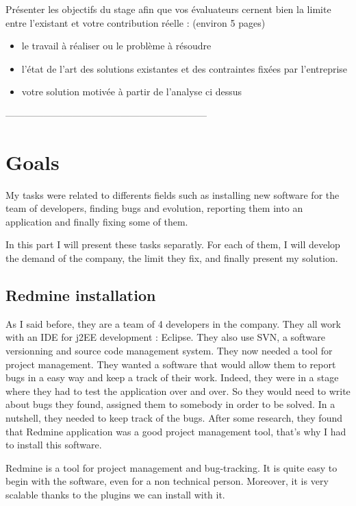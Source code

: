 

\newpage
Présenter les objectifs du stage afin que vos évaluateurs cernent bien la limite entre l’existant et votre contribution réelle : (environ 5 pages)
\begin{itemize}
	\item le travail à réaliser ou le problème à résoudre
	\item l’état de l’art des solutions existantes et des contraintes fixées par l’entreprise
	\item votre solution motivée à partir de l’analyse ci dessus
\end{itemize}


---------------------------------------------------------------

\newpage
\section{Goals}
My tasks were related to differents fields such as installing new software for the team 
of developers, finding bugs and evolution, reporting them into an application 
and finally fixing some of them. 

In this part I will present these tasks separatly. For each of them, I will develop 
the demand of the company, the limit they fix, and finally present my solution. 

\subsection{Redmine installation}
As I said before, they are a team of 4 developers in the company. 
They all work with an IDE for j2EE development : Eclipse. 
They also use SVN, a software versionning and source code management 
system. They now needed a tool for project management. 
They wanted a software that would allow them to report bugs in a easy way and keep a 
track of their work. Indeed, they were in a stage where they had to test the application
over and over. So they would need to write about bugs they found, assigned them to
somebody in order to be solved. In a nutshell, they needed to keep track of the bugs. 
After some research, they found that Redmine application was a good project management
tool, that's why I had to install this software. 

Redmine is a tool for project management and bug-tracking. It is quite easy to begin
with the software, even for a non technical person. Moreover, it is very scalable 
thanks to the plugins we can install with it. 

